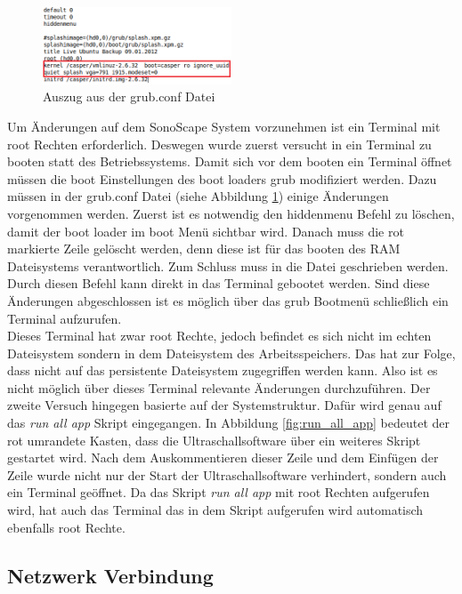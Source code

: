 \begin{figure}
\centering  	
\includegraphics[width=0.5\textwidth]{Sonoscape_Analyse/grub_conf} 
		\caption{{\small Auszug aus der grub.conf Datei}}
		\label{fig:grub_conf}
\end{figure}
Um Änderungen auf dem SonoScape System vorzunehmen ist ein Terminal mit root Rechten erforderlich. Deswegen wurde zuerst versucht in ein Terminal zu booten statt des Betriebssystems. Damit sich vor dem booten ein Terminal öffnet müssen die boot Einstellungen des boot loaders grub modifiziert werden. Dazu müssen in der grub.conf Datei (siehe Abbildung \ref{fig:grub_conf}) einige Änderungen vorgenommen werden. Zuerst ist es notwendig den hiddenmenu Befehl zu löschen, damit der boot loader im boot Menü sichtbar wird.
Danach muss die rot markierte Zeile gelöscht werden, denn diese ist für das booten des RAM Dateisystems verantwortlich. Zum Schluss muss 
 in die Datei geschrieben werden. Durch diesen Befehl kann direkt in das Terminal gebootet werden. Sind diese Änderungen abgeschlossen ist es möglich über das grub Bootmenü schließlich ein Terminal aufzurufen.\\
Dieses Terminal hat zwar root Rechte, jedoch befindet es sich nicht im echten Dateisystem sondern in dem Dateisystem des Arbeitsspeichers. Das hat zur Folge, dass nicht auf das persistente Dateisystem zugegriffen werden kann. Also ist es nicht möglich über dieses Terminal relevante Änderungen durchzuführen.
Der zweite Versuch hingegen basierte auf der Systemstruktur. Dafür wird genau auf das \textit{run all app} Skript eingegangen. In Abbildung \ref{fig:run_all_app} bedeutet der rot umrandete Kasten, dass die Ultraschallsoftware über ein weiteres Skript gestartet wird. Nach dem Auskommentieren dieser Zeile und dem Einfügen der Zeile  wurde nicht nur der Start der Ultraschallsoftware verhindert, sondern auch ein Terminal geöffnet. Da das Skript \textit{run all app} mit root Rechten aufgerufen wird, hat auch das Terminal das in dem Skript aufgerufen wird automatisch ebenfalls root Rechte.

\subsection{Netzwerk Verbindung}

